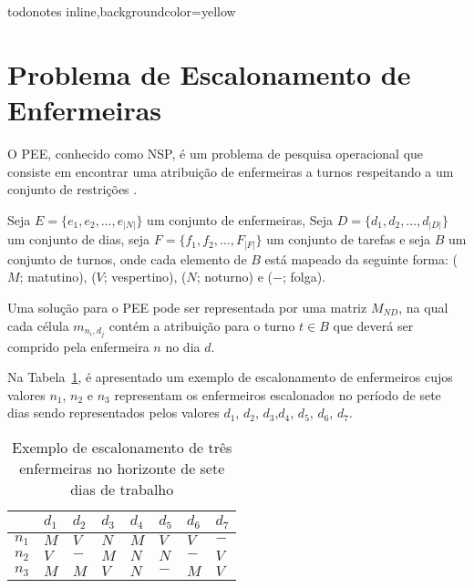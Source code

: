 { }

\presetkeys%
    {todonotes}%
    {inline,backgroundcolor=yellow}{}


\section{Problema de Escalonamento de Enfermeiras}


O \ac{PEE}, conhecido como \ac{NSP}, é um problema de pesquisa operacional que consiste em encontrar uma atribuição de enfermeiras a turnos respeitando a um conjunto de restrições \cite{ioanis:2015}.

Seja $E = \{e_1, e_2, \ldots, e_{|N|}\}$ um conjunto de enfermeiras, Seja $D = \{d_1, d_2, ..., d_{|D|}\}$ um conjunto de dias, seja $F = \{ f_1, f_2, ..., F_{|F|} \}$ um conjunto de tarefas e seja $B$ um conjunto de turnos, onde cada elemento de $B$ está mapeado da seguinte forma: ($M$; matutino), ($V$; vespertino), ($N$; noturno) e ($-$; folga).

Uma solução para o \ac{PEE} pode ser representada por uma matriz $M_{ND}$, na qual cada célula $m_{n_i,d_j}$ contém a atribuição para o turno $t\in B $ que deverá ser comprido pela enfermeira $n$ no dia $d$.


Na Tabela~\ref{enfermeira_dia}, é apresentado um exemplo de escalonamento de enfermeiros cujos valores $n_1$, $n_2$ e $n_3$ representam os enfermeiros escalonados no período de sete dias sendo representados pelos valores $d_1$, $d_2$, $d_3$,$d_4$, $d_5$, $d_6$, $d_7$.

\begin{table}[ht]
 \centering
\caption{Exemplo de escalonamento de três enfermeiras no horizonte de sete dias de trabalho \label{enfermeira_dia}}
\begin{tabular}{r|l|l|l|l|l|l|l}
  	   & $d_1$ & $d_2$ & $d_3$ & $d_4$ & $d_5$ & $d_6$ & $d_7$ \\ \hline
 $n_1$ & $M$  & $V$  & $N$  & $M$  & $V$  & $V$  & $-$ \\ \hline
 $n_2$ & $V$  & $-$  & $M$  & $N$  & $N$  & $-$  & $V$\\ \hline
 $n_3$ & $M$  & $M$  & $V$  & $N$  & $-$  & $M$  & $V$
\end{tabular}
\end{table}


